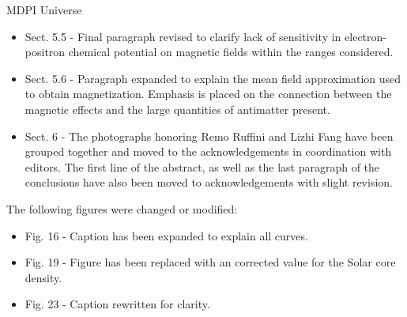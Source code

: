 \documentclass[a4paper, 10pt]{letter}
\begin{document}
\begin{letter}{MDPI Universe}
\begin{itemize}
    \item Sect. 5.5 - Final paragraph revised to clarify lack of sensitivity in electron-positron chemical potential on magnetic fields within the ranges considered.
    \item Sect. 5.6 - Paragraph expanded to explain the mean field approximation used to obtain magnetization. Emphasis is placed on the connection between the magnetic effects and the large quantities of antimatter present.
    \item Sect. 6 - The photographs honoring Remo Ruffini and Lizhi Fang have been grouped together and moved to the acknowledgements in coordination with editors. The first line of the abstract, as well as the last paragraph of the conclusions have also been moved to acknowledgements with slight revision.
\end{itemize}

The following figures were changed or modified:
\begin{itemize}
    \item Fig. 16 - Caption has been expanded to explain all curves.
    \item Fig. 19 - Figure has been replaced with an corrected value for the Solar core density.
    \item Fig. 23 - Caption rewritten for clarity.
\end{itemize}


\end{letter}
\end{document}
